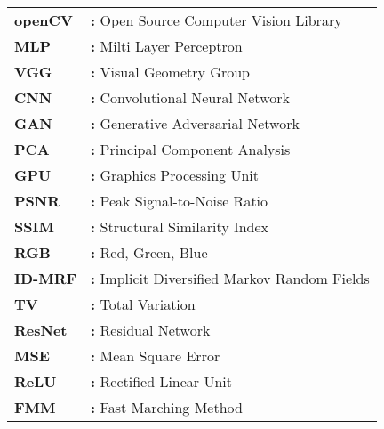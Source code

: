 \hspace{-3mm}

\begin{tabular}{ p{2cm} l }
    {\bf{openCV}} & {\bf:} Open Source Computer Vision Library\\
    {\bf{MLP}} & {\bf:} Milti Layer Perceptron\\
    {\bf{VGG}} & {\bf:} Visual Geometry Group\\
    {\bf{CNN}} & {\bf:} Convolutional Neural Network\\
    {\bf{GAN}} & {\bf:} Generative Adversarial Network\\
    {\bf{PCA}} & {\bf:} Principal Component Analysis\\
    {\bf{GPU}} & {\bf:} Graphics Processing Unit\\
    {\bf{PSNR}} & {\bf:} Peak Signal-to-Noise Ratio\\
    {\bf{SSIM}} & {\bf:} Structural Similarity Index\\
    {\bf{RGB}} & {\bf:} Red, Green, Blue\\
    {\bf{ID-MRF}} & {\bf:} Implicit Diversified Markov Random Fields\\
    {\bf{TV}} & {\bf:} Total Variation\\
    {\bf{ResNet}} & {\bf:} Residual Network\\
    {\bf{MSE}} & {\bf:} Mean Square Error\\
    {\bf{ReLU}} & {\bf:} Rectified Linear Unit\\
    {\bf{FMM}} & {\bf:} Fast Marching Method\\
\end{tabular}

